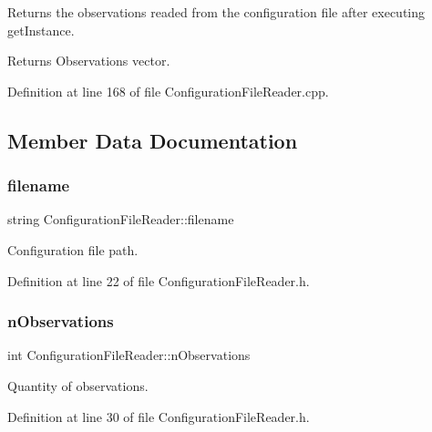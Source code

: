 Returns the observations readed from the configuration file after executing get\+Instance. \begin{DoxyReturn}{Returns}
Observations vector. 
\end{DoxyReturn}


Definition at line 168 of file Configuration\+File\+Reader.\+cpp.



\subsection{Member Data Documentation}
\mbox{\label{classConfigurationFileReader_a007ec73fe536b697bd200a6b0c66f6e6}} 
\subsubsection{\texorpdfstring{filename}{filename}}
{\footnotesize\ttfamily string Configuration\+File\+Reader\+::filename\hspace{0.3cm}{\ttfamily [private]}}

Configuration file path. 

Definition at line 22 of file Configuration\+File\+Reader.\+h.

\mbox{\label{classConfigurationFileReader_a5f6e229fb0ad9c7259a71977c7ead9b3}} 
\subsubsection{\texorpdfstring{n\+Observations}{nObservations}}
{\footnotesize\ttfamily int Configuration\+File\+Reader\+::n\+Observations\hspace{0.3cm}{\ttfamily [private]}}

Quantity of observations. 

Definition at line 30 of file Configuration\+File\+Reader.\+h.

\mbox{\label{classConfigurationFileReader_a669b280cc5bc410dba130ee9f14e9cac}} 
